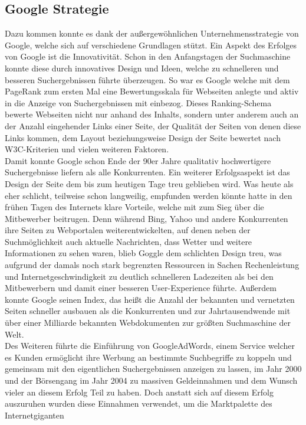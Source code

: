 \subsection{Google Strategie}\label{subsec:google-strategie}
Dazu kommen konnte es dank der außergewöhnlichen Unternehmensstrategie von Google, welche sich auf verschiedene Grundlagen
stützt.
Ein Aspekt des Erfolges von Google ist die Innovativität.
Schon in den Anfangstagen der Suchmaschine konnte diese durch innovatives Design und Ideen, welche zu schnelleren und
besseren Suchergebnissen führte überzeugen.
So war es Google welche mit dem PageRank zum ersten Mal eine Bewertungsskala für Webseiten anlegte und aktiv in die
Anzeige von Suchergebnissen mit einbezog.
Dieses Ranking-Schema bewerte Webseiten nicht nur anhand des Inhalts, sondern unter anderem auch an der Anzahl
eingehender Links einer Seite, der Qualität der Seiten von denen diese Links kommen, dem Layout beziehungsweise Design
der Seite bewertet nach W3C-Kriterien und vielen weiteren Faktoren.
\\
Damit konnte Google schon Ende der 90er Jahre qualitativ hochwertigere Suchergebnisse liefern als alle Konkurrenten.
Ein weiterer Erfolgsaspekt ist das Design der Seite dem bis zum heutigen Tage treu geblieben wird.
Was heute als eher schlicht, teilweise schon langweilig, empfunden werden könnte hatte in den frühen Tagen des Internets
klare Vorteile, welche mit zum Sieg über die Mitbewerber beitrugen.
Denn während Bing, Yahoo und andere Konkurrenten ihre Seiten zu Webportalen weiterentwickelten, auf denen neben der
Suchmöglichkeit auch aktuelle Nachrichten, dass Wetter und weitere Informationen zu sehen waren, blieb Goggle dem schlichten
Design treu, was aufgrund der damals noch stark begrenzten Ressourcen in Sachen Rechenleistung und Internetgeschwindigkeit
zu deutlich schnelleren Ladezeiten als bei den Mitbewerbern und damit einer besseren User-Experience führte.
Außerdem konnte Google seinen Index, das heißt die Anzahl der bekannten und vernetzten Seiten schneller ausbauen als die
Konkurrenten und zur Jahrtausendwende mit über einer Milliarde bekannten Webdokumenten zur größten Suchmaschine der Welt.
\\
Des Weiteren führte die Einführung von GoogleAdWords, einem Service welcher es Kunden ermöglicht ihre Werbung an
bestimmte Suchbegriffe zu koppeln und gemeinsam mit den eigentlichen Suchergebnissen anzeigen zu lassen, im Jahr 2000 und
der Börsengang im Jahr 2004 zu massiven Geldeinnahmen und dem Wunsch vieler an diesem Erfolg Teil zu haben.
Doch anstatt sich auf diesem Erfolg auszuruhen wurden diese Einnahmen verwendet, um die Marktpalette des Internetgiganten
